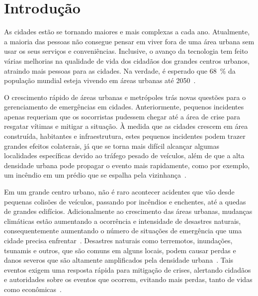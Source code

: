 \chapter{Introdução}\label{cap:introducao}

\begin{refsection}

As cidades estão se tornando maiores e mais complexas a cada ano. Atualmente, a maioria das pessoas não consegue pensar em viver fora de uma área urbana sem usar os seus serviços e conveniências. Inclusive, o avanço da tecnologia tem feito várias melhorias na qualidade de vida dos cidadãos dos grandes centros urbanos, atraindo mais pessoas para as cidades. Na verdade, é esperado que 68~\% da população mundial esteja vivendo em áreas urbanas até 2050~\cite{de_Amorim_2019}.

O crescimento rápido de áreas urbanas e metrópoles trás novas questões para o gerenciamento de emergências em cidades. Anteriormente, pequenos incidentes apenas requeriam que os socorristas pudessem chegar até a área de crise para resgatar vítimas e mitigar a situação. À medida que as cidades crescem em área construída, habitantes e infraestrutura, estes pequenos incidentes podem trazer grandes efeitos colaterais, já que se torna mais difícil alcançar algumas localidades específicas devido ao tráfego pesado de veículos, além de que a alta densidade urbana pode propagar o evento mais rapidamente, como por exemplo, um incêndio em um prédio que se espalha pela vizinhança~\cite{Ghosh201713}.

Em um grande centro urbano, não é raro acontecer acidentes que vão desde pequenas colisões de veículos, passando por incêndios e enchentes, até a quedas de grandes edifícios. Adicionalmente ao crescimento das áreas urbanas, mudanças climáticas estão aumentando a ocorrência e intensidade de desastres naturais, consequentemente aumentando o número de situações de emergência que uma cidade precisa enfrentar~\cite{boukerche2018smart}. Desastres naturais como terremotos, inundações, tsunamis e outros, que são comuns em alguns locais, podem causar perdas e danos severos que são altamente amplificados pela densidade urbana~\cite{Gosavi2020582}. Tais eventos exigem uma resposta rápida para mitigação de crises, alertando cidadãos e autoridades sobre os eventos que ocorrem, evitando mais perdas, tanto de vidas como econômicas~\cite{Costa_2019}.


\end{refsection}

